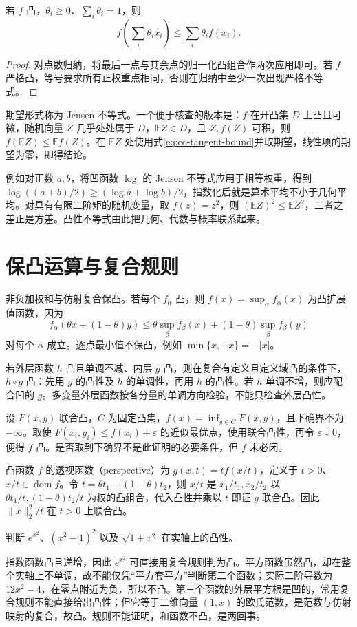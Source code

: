 \documentclass[UTF8,12pt,a4paper,fontset=fandol]{ctexbook}
\begin{document}
\begin{proposition}[詹森不等式]
若 $f$ 凸，$\theta_i\geq0$、$\sum_i\theta_i=1$，则
\[
 f\left(\sum_i\theta_i x_i\right)\leq\sum_i\theta_i f(x_i).
\]
\end{proposition}
\begin{proof}
对点数归纳，将最后一点与其余点的归一化凸组合作两次应用即可。若 $f$ 严格凸，等号要求所有正权重点相同，否则在归纳中至少一次出现严格不等式。
\end{proof}
期望形式称为 Jensen 不等式。一个便于核查的版本是：$f$ 在开凸集 $D$ 上凸且可微，随机向量 $Z$ 几乎处处属于 $D$，$\mathbb EZ\in D$，且 $Z,f(Z)$ 可积，则 $f(\mathbb EZ)\leq\mathbb E f(Z)$。在 $\mathbb EZ$ 处使用式\eqref{eq:co-tangent-bound}并取期望，线性项的期望为零，即得结论。

例如对正数 $a,b$，将凹函数 $\log$ 的 Jensen 不等式应用于相等权重，得到 $\log((a+b)/2)\geq(\log a+\log b)/2$，指数化后就是算术平均不小于几何平均。对具有有限二阶矩的随机变量，取 $f(z)=z^2$，则 $(\mathbb EZ)^2\leq\mathbb EZ^2$，二者之差正是方差。凸性不等式由此把几何、代数与概率联系起来。

\section{保凸运算与复合规则}

非负加权和与仿射复合保凸。若每个 $f_\alpha$ 凸，则 $f(x)=\sup_\alpha f_\alpha(x)$ 为凸扩展值函数，因为
\[
 f_\alpha(\theta x+(1-\theta)y)
 \leq\theta\sup_\beta f_\beta(x)+(1-\theta)\sup_\beta f_\beta(y)
\]
对每个 $\alpha$ 成立。逐点最小值不保凸，例如 $\min\{x,-x\}=-|x|$。

若外层函数 $h$ 凸且单调不减、内层 $g$ 凸，则在复合有定义且定义域凸的条件下，$h\circ g$ 凸：先用 $g$ 的凸性及 $h$ 的单调性，再用 $h$ 的凸性。若 $h$ 单调不增，则应配合凹的 $g$。多变量外层函数按各分量的单调方向检验，不能只检查外层凸性。

设 $F(x,y)$ 联合凸，$C$ 为固定凸集，$f(x)=\inf_{y\in C}F(x,y)$，且下确界不为 $-\infty$。取使 $F(x_i,y_i)\leq f(x_i)+\varepsilon$ 的近似最优点，使用联合凸性，再令 $\varepsilon\downarrow0$，便得 $f$ 凸。是否取到下确界不是此证明的必要条件，但 $f$ 未必闭。

凸函数 $f$ 的透视函数（perspective）为 $g(x,t)=t f(x/t)$，定义于 $t>0$、$x/t\in\operatorname{dom}f$。令 $t=\theta t_1+(1-\theta)t_2$，则 $x/t$ 是 $x_1/t_1,x_2/t_2$ 以 $\theta t_1/t,(1-\theta)t_2/t$ 为权的凸组合，代入凸性并乘以 $t$ 即证 $g$ 联合凸。因此 $\|x\|_2^2/t$ 在 $t>0$ 上联合凸。

\begin{example}[判断复合函数时先检查单调性]
判断 $e^{x^2}$、$(x^2-1)^2$ 以及 $\sqrt{1+x^2}$ 在实轴上的凸性。
\end{example}
\begin{solve}
指数函数凸且递增，因此 $e^{x^2}$ 可直接用复合规则判为凸。平方函数虽然凸，却在整个实轴上不单调，故不能仅凭“平方套平方”判断第二个函数；实际二阶导数为 $12x^2-4$，在零点附近为负，所以不凸。第三个函数的外层平方根是凹的，常用复合规则不能直接给出凸性；但它等于二维向量 $(1,x)$ 的欧氏范数，是范数与仿射映射的复合，故凸。规则不能证明，和函数不凸，是两回事。
\end{solve}
\end{document}
